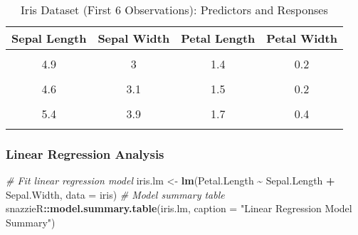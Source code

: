 \documentclass[
]{article}
\newenvironment{Shaded}{\begin{snugshade}}{\end{snugshade}}
\newcommand{\AttributeTok}[1]{\textcolor[rgb]{0.13,0.29,0.53}{#1}}
\newcommand{\CommentTok}[1]{\textcolor[rgb]{0.56,0.35,0.01}{\textit{#1}}}
\newcommand{\FunctionTok}[1]{\textcolor[rgb]{0.13,0.29,0.53}{\textbf{#1}}}
\newcommand{\NormalTok}[1]{#1}
\newcommand{\OtherTok}[1]{\textcolor[rgb]{0.56,0.35,0.01}{#1}}
\newcommand{\SpecialCharTok}[1]{\textcolor[rgb]{0.81,0.36,0.00}{\textbf{#1}}}
\newcommand{\StringTok}[1]{\textcolor[rgb]{0.31,0.60,0.02}{#1}}
\begin{document}
\begin{table}[H]
\centering
\caption{\label{tab:unnamed-chunk-3}Iris Dataset (First 6 Observations): Predictors and Responses}
\centering
\fontsize{12}{14}\selectfont
\begin{tabular}[t]{cccc}
\toprule
Sepal Length & Sepal Width & Petal Length & Petal Width\\
\midrule
\cellcolor{gray!10}{5.1} & \cellcolor{gray!10}{3.5} & \cellcolor{gray!10}{1.4} & \cellcolor{gray!10}{0.2}\\
4.9 & 3 & 1.4 & 0.2\\
\cellcolor{gray!10}{4.7} & \cellcolor{gray!10}{3.2} & \cellcolor{gray!10}{1.3} & \cellcolor{gray!10}{0.2}\\
4.6 & 3.1 & 1.5 & 0.2\\
\cellcolor{gray!10}{5} & \cellcolor{gray!10}{3.6} & \cellcolor{gray!10}{1.4} & \cellcolor{gray!10}{0.2}\\
5.4 & 3.9 & 1.7 & 0.4\\
\cellcolor{gray!10}{\vdots} & \cellcolor{gray!10}{\vdots} & \cellcolor{gray!10}{\vdots} & \cellcolor{gray!10}{\vdots}\\
\bottomrule
\end{tabular}
\end{table}

\subsubsection{Linear Regression
Analysis}\label{linear-regression-analysis}

\begin{Shaded}
\begin{Highlighting}[]
\CommentTok{\# Fit linear regression model}
\NormalTok{iris.lm }\OtherTok{\textless{}{-}} \FunctionTok{lm}\NormalTok{(Petal.Length }\SpecialCharTok{\textasciitilde{}}\NormalTok{ Sepal.Length }\SpecialCharTok{+}\NormalTok{ Sepal.Width, }\AttributeTok{data =}\NormalTok{ iris)}
\CommentTok{\# Model summary table}
\NormalTok{snazzieR}\SpecialCharTok{::}\FunctionTok{model.summary.table}\NormalTok{(iris.lm, }\AttributeTok{caption =} \StringTok{"Linear Regression Model Summary"}\NormalTok{)}
\end{Highlighting}
\end{Shaded}
\end{document}
